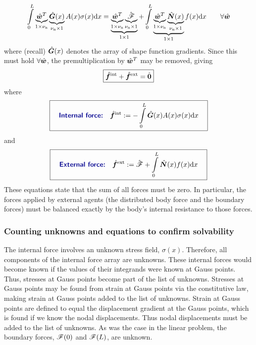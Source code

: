 \begin{equation}
 \int\limits_0^L \underbrace{\hat{\bm{w}}^T}_{1\times{\nu_\text{n}}}\underbrace{\hat{\bm{G}}(x)}_{{\nu_\text{n}}\times1} A(x) \sigma(x) \mathrm{d} x 
= 
\underbrace{\underbrace{\hat{\bm{w}}^T}_{1\times{\nu_\text{n}}}\underbrace{\hat{\bm{\mathscr{F}}}}_{{\nu_\text{n}}\times1}}_{1\times1}
+  \int\limits_0^L \underbrace{\underbrace{\hat{\bm{w}}^T}_{1\times{\nu_\text{n}}}\underbrace{\hat{\bm{N}}(x)}_{{\nu_\text{n}}\times1}}_{1\times1}f(x)
\mathrm{d} x
 \qquad\forall\hat{\bm{w}}
\label{eq:nonLinearBarWeakFormWithForces}
\end{equation}
where (recall) $\hat{\bm{G}}(x)$ denotes the array of shape function gradients.
Since this must hold $\forall\hat{\bm{w}}$, the premultiplication by $\hat{\bm{w}}^T$ may be removed, giving
\begin{equation}
 \boxed{\hat{\bm{f}}^\text{int} +  \hat{\bm{f}}^\text{ext} = \hat{\bm{0}}}
\label{eq:nonLinearBarWeakFormWithForcesDiscr}
\end{equation}
%
where
\begin{equation}
\boxit{\quad
\text{\Defn{Internal force:}}\quad
  \Array{f}^\text{int}\definedEqual -\int\limits_0^L \gradNBFa(x) A(x) \sigma(x) \dd x
\quad}
\label{eq:nonlinearBarInternalForce}
\end{equation}
and
\begin{equation}
\boxit{\quad
\text{\Defn{External force:}}\quad
  \Array{f}^\text{ext}
\definedEqual
\Array{\tractionForce} +  \int\limits_0^L \NBFa(x)f(x)\dd x
\quad}
\label{eq:nonlinearBarExternalForce}
\end{equation}
These equations state that the sum of all forces must be zero. In particular, the forces applied by external agents (the distributed body force and the boundary forces) must be balanced exactly by the body's internal resistance to those forces.


\subsubsection{Counting unknowns and equations to confirm solvability}
The internal force involves an unknown stress field, $\sigma(x)$. Therefore, all components of the internal force array are unknowns.  These internal forces would become known if the values of their integrands were known at Gauss points. Thus, stresses at Gauss points become part of the list of unknowns. Stresses at Gauss points may be found from strain at Gauss points via the constitutive law, making strain at Gauss  points added to the list of unknowns. Strain at Gauss points are defined to equal the displacement gradient at the Gauss points, which is found if we know the nodal displacements. Thus nodal displacements must be added to the list of unknowns.  As was the case in the linear problem, the boundary forces, $\mathscr{F}(0)$ and $\mathscr{F}(L)$, are unknown. 

